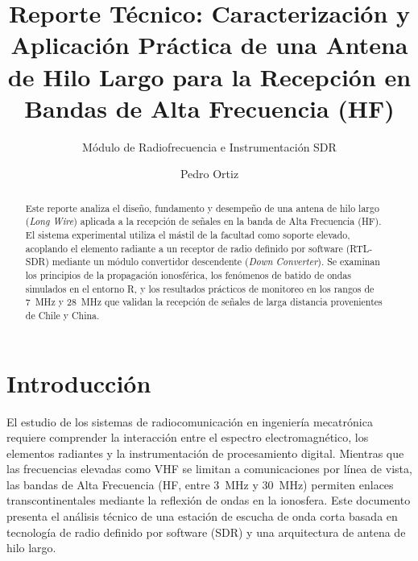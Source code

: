 \documentclass[runningheads]{llncs}
\begin{document}
\title{Reporte Técnico: Caracterización y Aplicación Práctica de una Antena de Hilo Largo para la Recepción en Bandas de Alta Frecuencia (HF)}

\subtitle{Módulo de Radiofrecuencia e Instrumentación SDR}

\author{Pedro Ortiz}



\maketitle

\begin{abstract}
Este reporte analiza el diseño, fundamento y desempeño de una antena de hilo largo (\textit{Long Wire}) aplicada a la recepción de señales en la banda de Alta Frecuencia (HF). El sistema experimental utiliza el mástil de la facultad como soporte elevado, acoplando el elemento radiante a un receptor de radio definido por software (RTL-SDR) mediante un módulo convertidor descendente (\textit{Down Converter}). Se examinan los principios de la propagación ionosférica, los fenómenos de batido de ondas simulados en el entorno R, y los resultados prácticos de monitoreo en los rangos de 7~MHz y 28~MHz que validan la recepción de señales de larga distancia provenientes de Chile y China.

\end{abstract}

\section{Introducción}
El estudio de los sistemas de radiocomunicación en ingeniería mecatrónica requiere comprender la interacción entre el espectro electromagnético, los elementos radiantes y la instrumentación de procesamiento digital. Mientras que las frecuencias elevadas como VHF se limitan a comunicaciones por línea de vista, las bandas de Alta Frecuencia (HF, entre 3~MHz y 30~MHz) permiten enlaces transcontinentales mediante la reflexión de ondas en la ionosfera. Este documento presenta el análisis técnico de una estación de escucha de onda corta basada en tecnología de radio definido por software (SDR) y una arquitectura de antena de hilo largo.
\end{document}
